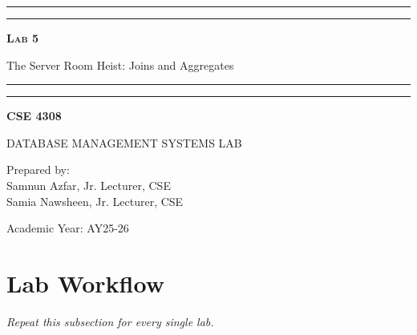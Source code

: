 \documentclass[12pt,a4paper]{article}
\newcommand{\labNo}{Lab 5}
\newcommand{\labTopic}{The Server Room Heist: Joins and Aggregates}
\newcommand{\courseCode}{CSE 4308}
\newcommand{\courseTitleLong}{DATABASE MANAGEMENT SYSTEMS LAB}
\newcommand{\instructorName}{Samnun Azfar, Jr. Lecturer, CSE\\ Samia Nawsheen, Jr. Lecturer, CSE}
\newcommand{\academicYear}{AY25-26}
\begin{document}
\begin{titlepage}
    \centering
    \vspace*{2\baselineskip}

    \rule{14cm}{2pt}\vspace*{-0.8\baselineskip}\vspace*{1.5pt}
    \rule{14cm}{0.5pt}\vspace{2\baselineskip}

    {\Huge\bfseries\scshape \labNo\par} %
    \vspace{3mm}
    {\Large \labTopic} %
    \vspace{3mm}

    \rule{14cm}{0.5pt}\vspace*{-0.7\baselineskip}\vspace{2.5pt}
    \rule{14cm}{2pt}

    \vspace{2\baselineskip}

    {\Large\bfseries \courseCode\par} %
    \vspace{1\baselineskip}
    {\large \courseTitleLong\par} %

    \vfill
    {\normalsize Prepared by:\\ \instructorName\par} %
    {\normalsize Academic Year: \academicYear\par} %
\end{titlepage}

\newpage
\tableofcontents
\newpage
\section*{Lab Workflow}



\textit{Repeat this subsection for every single lab.}
\end{document}
